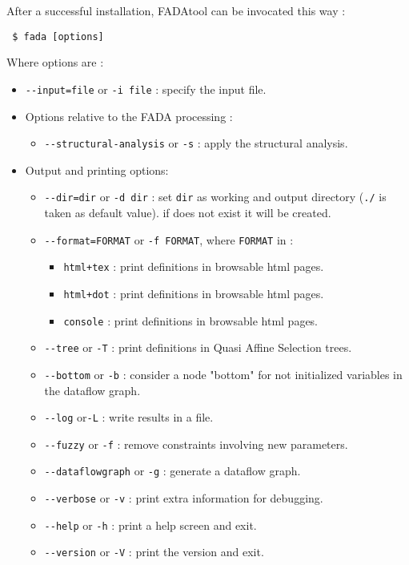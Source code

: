 After a successful installation, FADAtool can be invocated this way :

\begin{verbatim}
 $ fada [options]
\end{verbatim}

\label{adaan_options}

Where options are :

\begin{itemize}
 \item \verb|--input=file| or \verb|-i file|    : specify the input file.
 \item Options relative to the FADA processing :
 \begin{itemize}
	\item \verb|--structural-analysis| or \verb|-s| :  apply the structural analysis.


 \end{itemize}
 \item Output and printing options:
    \begin{itemize}
        \item \verb|--dir=dir| or \verb|-d dir|        : set \verb|dir| as working and output directory (\verb|./| is taken as default value). if does not exist it will be created.
	\item \verb|--format=FORMAT| or \verb|-f FORMAT|, where \verb|FORMAT| in :
	\begin{itemize}
		\item \verb|html+tex| : print definitions in browsable html pages.
		\item \verb|html+dot| : print definitions in browsable html pages.
		\item \verb|console| : print definitions in browsable html pages.
	\end{itemize}

        \item \verb|--tree| or \verb|-T|        : print definitions in Quasi Affine Selection trees.
        \item \verb|--bottom| or \verb|-b|        : consider a node "bottom" for not initialized variables in the dataflow graph.
        \item \verb|--log| or\verb|-L|               : write results in a file.
        \item \verb|--fuzzy| or \verb|-f|            : remove constraints involving new parameters.
        \item \verb|--dataflowgraph| or \verb|-g|    : generate a dataflow graph.
        \item \verb|--verbose| or \verb|-v|          : print extra information for debugging.
        \item \verb|--help| or \verb|-h|        : print a help screen and exit.
        \item \verb|--version| or \verb|-V|          : print the version and exit.
     \end{itemize}
\end{itemize}

